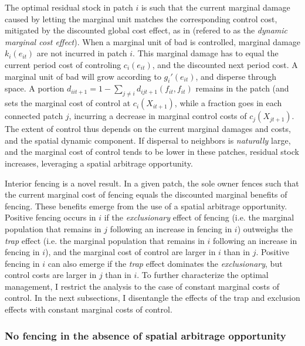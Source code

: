  The optimal residual stock in patch $i$ is such that the current marginal damage caused by letting the marginal unit matches the corresponding control cost, mitigated by the discounted global cost effect, as in \cite{costello_private_2017} (refered to as the \textit{dynamic marginal cost effect}). When a marginal unit of bad is controlled, marginal damage $k_i(e_{it})$ are not incurred in patch $i$. This marginal damage has to equal the current period cost of controling $c_i(e_{it})$, and the discounted next period cost. A marginal unit of bad will grow according to $g_i'(e_{it})$, and disperse through space. A portion $d_{iit+1} = 1 - \sum_{j\neq i}d_{ijt+1}(f_{it}, f_{it})$ remains in the patch (and sets the marginal cost of control at $c_i(X_{it+1})$, while a fraction goes in each connected patch $j$, incurring a decrease in marginal control costs of $c_j(X_{jt+1})$. The extent of control thus depends on the current marginal damages and costs, and the spatial dynamic component. If dispersal to neighbors is \textit{naturally} large, and the marginal cost of control tends to be lower in these patches, residual stock increases, leveraging a spatial arbitrage opportunity.

Interior fencing is a novel result. In a given patch, the sole owner fences such that the current marginal cost of fencing equals the discounted marginal benefits of fencing. These benefits emerge from the use of a spatial arbitrage opportunity. Positive fencing occurs in $i$ if the \textit{exclusionary} effect of fencing (i.e. the marginal population that remains in $j$ following an increase in fencing in $i$) outweighs the \textit{trap} effect (i.e. the marginal population that remains in $i$ following an increase in fencing in $i$), and the marginal cost of control are larger in $i$ than in $j$. Positive fencing in $i$ can also emerge if the \textit{trap} effect dominates the \textit{exclusionary}, but control costs are larger in $j$ than in $i$. To further characterize the optimal management, I restrict the analysis to the case of constant marginal costs of control. In the next subsections, I disentangle the effects of the trap and exclusion effects with constant marginal costs of control.


\subsubsection{No fencing in the absence of spatial arbitrage opportunity}

